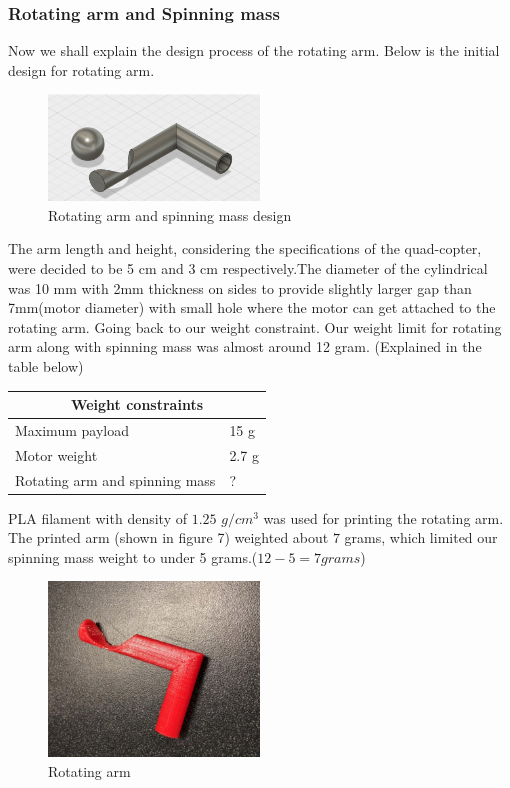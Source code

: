 \subsubsection{Rotating arm and Spinning mass}
Now we shall explain the design process of the rotating arm. 
Below is the initial design for rotating arm. 
\begin{figure}[h]
\centering
\includegraphics[width=0.5\textwidth]{./Amir_img/rotatingArm.png}
\caption{Rotating arm and spinning mass design}
\end{figure}
\newline
The arm length and height, considering the specifications of the quad-copter, were decided to be 5 cm and 3 cm respectively.The diameter of the cylindrical was 10 mm with 2mm thickness on sides to provide slightly larger gap than 7mm(motor diameter) with small hole where the motor can get attached to the rotating arm. 
\newline
Going back to our weight constraint. Our weight limit for rotating arm along with spinning mass was almost around 12 gram. (Explained in the table below)

\begin{center}
\begin{tabular}{ |p{6cm}|p{1cm}|  }
 \hline
 \multicolumn{2}{|c|}{Weight constraints} \\
 \hline
 Maximum payload   & 15 g   \\
 Motor weight &   2.7 g  \\
 Rotating arm and spinning mass & ? \\
 \hline
\end{tabular}
\end{center}

PLA filament with density of $1.25$ $g/cm^3$ was used for printing the rotating arm. The printed arm (shown in figure 7) weighted about $7$ grams, which limited our spinning mass weight to under 5 grams.($12-5=7 grams$)
\begin{figure}[h]
\centering
\includegraphics[width=0.5\textwidth]{./Amir_img/rotatingArm1.png}
\caption{Rotating arm}
\end{figure}

